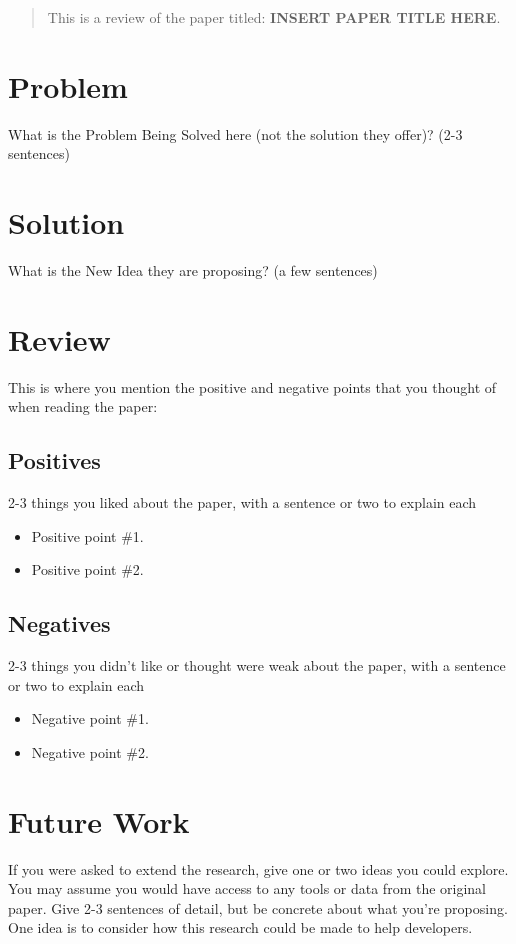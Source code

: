 \documentclass[sigconf, 10pt]{acmart}
\begin{document}
\title{}
\begin{abstract}
    This is a review of the paper titled: \textbf{INSERT PAPER TITLE HERE}.
\end{abstract}
\maketitle
\balance
\section{Problem}
What is the Problem Being Solved here (not the solution they offer)? (2-3 sentences)
\section{Solution}
What is the New Idea they are proposing?  (a few sentences)
\section{Review}
This is where you mention the positive and negative points that you thought of when reading the paper:
\subsection{Positives}
2-3 things you liked about the paper, with a sentence or two to explain each
\begin{itemize}
    \item Positive point \#1.
    \item Positive point \#2.
\end{itemize}

\subsection{Negatives}
2-3 things you didn't like or thought were weak about the paper, with a sentence or two to explain each
\begin{itemize}
    \item Negative point \#1.
    \item Negative point \#2.
\end{itemize}

\section{Future Work}
If you were asked to extend the research, give one or two ideas you could explore.  You may assume you would have access to any tools or data from the original paper.  Give 2-3 sentences of detail, but be concrete about what you're proposing.  One idea is to consider how this research could be made to help developers.
\end{document}
